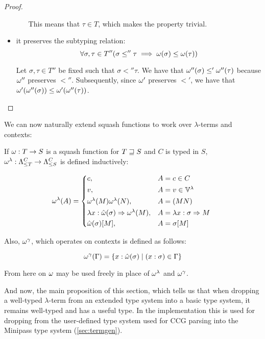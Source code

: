 \documentclass[main.tex]{subfiles}
\begin{document}
\begin{proof}
\begin{itemize}
\begin{itemize}
                    This means that $\tau \in T$, which makes the property trivial.
            \end{itemize}

        \item it preserves the subtyping relation:
            \[ \forall \sigma, \tau \in T'' (\sigma \less'' \tau \implies
                \squash(\sigma) \less \squash(\tau)) \]

            Let $\sigma, \tau \in T''$ be fixed such that $\sigma \less'' \tau$.
            We have that $\squash''(\sigma) \less' \squash''(\tau)$ because
            $\squash''$ preserves $\less''$. Subsequently, since $\squash'$
            preserves $\less'$, we have that $\squash'(\squash''(\sigma))
            \less \squash'(\squash''(\tau))$.
    \end{itemize}
\end{proof}

We can now naturally extend squash functions to work over $\lambda$-terms
and contexts:
\begin{defn}
    If $\squash: T \fun S$ is a squash function for $T \tless S$ and
    $C$ is typed in $S$,
    $\lsquash: \fancylambda{T}{C} \fun \fancylambda{S}{C}$
    is defined inductively:

    \[
        \lsquash(A) =
        \begin{cases*}
            c ,& $A = c \in C$ \\
            v ,& $A = v \in \lvars$ \\
            \lsquash(M) \lsquash(N) ,& $A = (MN)$ \\
            \lambda x : \tsquash(\sigma) \abstr \lsquash(M)
 ,& $A = \lambda x : \sigma \abstr M$ \\
                \tsquash(\sigma)[M] ,& $A = \sigma[M]$ \\
        \end{cases*}
    \]

    Also,
    $\consquash$, which operates on contexts
    is defined as follows:

    \[
        \consquash(\Gamma)
            = \{ x : \tsquash(\sigma) \mid (x : \sigma) \in \Gamma \}
    \]
\end{defn}

From here on $\squash$ may be used freely in place of $\lsquash$
and $\consquash$.

And now, the main proposition of this section, which tells us that when
dropping a well-typed $\lambda$-term from an extended type system into
a basic type system, it remains well-typed and has a useful type.
In the implementation this is used for dropping from the user-defined
type system used for CCG parsing into the Minipass type system
(\cref{sec:termgen}).
\end{document}
